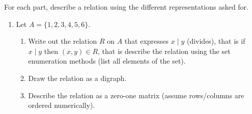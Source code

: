 \begin{questions}
\begin{solution}
\end{solution}




 For each part, describe a relation using the different representations asked for. 

\begin{enumerate}[label=(\alph*),itemsep=1pt,parsep=0pt,
        topsep=0pt,partopsep=0pt]
    \item Let $A = \{1, 2, 3, 4, 5, 6 \}$.  
    \begin{enumerate}[label=(\roman*)]
    	\item  Write out the relation $R$ on $A$ that expresses $x\;|\;y$ (divides), that is if $x \;|\; y$ then $(x, y) \in R$, that is describe the relation using the set enumeration methods (list all elements of the set).  
    	\item  Draw the relation as a digraph. 
    	\item  Describe the relation as a zero-one matrix (assume rows/columns are ordered numerically). 
    \end{enumerate}


\end{enumerate}
\end{questions}
